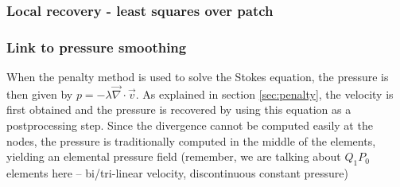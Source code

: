 \subsubsection{Local recovery - least squares over patch}



\subsubsection{Link to pressure smoothing}

When the penalty method is used to solve the Stokes equation, the pressure
is then given by $p=-\lambda \vec\nabla \cdot \vec v$. As explained in 
section \ref{sec:penalty}, the velocity is first obtained and the pressure 
is recovered by using this equation as a postprocessing step. Since the divergence 
cannot be computed easily at the nodes, the pressure is traditionally computed 
in the middle of the elements, yielding an elemental pressure field (remember, 
we are talking about $Q_1P_0$ elements here -- bi/tri-linear velocity, discontinuous
constant pressure)




